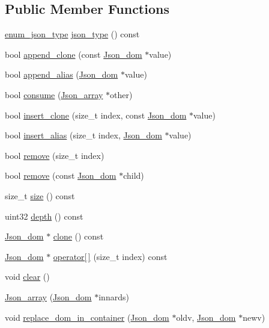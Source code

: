 \subsection*{Public Member Functions}
\begin{DoxyCompactItemize}
\item 
\mbox{\hyperlink{classJson__dom_af37eed7dfe1da1d6507d3ab85320eb03}{enum\+\_\+json\+\_\+type}} \mbox{\hyperlink{classJson__array_adbf357741dff1a92b01bfd31f97c1424}{json\+\_\+type}} () const
\item 
bool \mbox{\hyperlink{classJson__array_ae1240558ff2fa4cb2bae81d8dd332725}{append\+\_\+clone}} (const \mbox{\hyperlink{classJson__dom}{Json\+\_\+dom}} $\ast$value)
\item 
bool \mbox{\hyperlink{classJson__array_abd10bd299c6268b5195e79ed5536be1f}{append\+\_\+alias}} (\mbox{\hyperlink{classJson__dom}{Json\+\_\+dom}} $\ast$value)
\item 
bool \mbox{\hyperlink{classJson__array_a49c8a014041739ebb69367a5710ff802}{consume}} (\mbox{\hyperlink{classJson__array}{Json\+\_\+array}} $\ast$other)
\item 
bool \mbox{\hyperlink{classJson__array_acb33be78e43dd7b8c608dcbcb3a50e0e}{insert\+\_\+clone}} (size\+\_\+t index, const \mbox{\hyperlink{classJson__dom}{Json\+\_\+dom}} $\ast$value)
\item 
bool \mbox{\hyperlink{classJson__array_a9638175903fd33aa8bde389d028a7eb7}{insert\+\_\+alias}} (size\+\_\+t index, \mbox{\hyperlink{classJson__dom}{Json\+\_\+dom}} $\ast$value)
\item 
bool \mbox{\hyperlink{classJson__array_a377430a4a9ef9f7c22340d80b3bc74f7}{remove}} (size\+\_\+t index)
\item 
bool \mbox{\hyperlink{classJson__array_a0912b69f4733852316976f2dba87ad9a}{remove}} (const \mbox{\hyperlink{classJson__dom}{Json\+\_\+dom}} $\ast$child)
\item 
size\+\_\+t \mbox{\hyperlink{classJson__array_aa6ddabea5c2cd9e38920f32abf2e6e26}{size}} () const
\item 
uint32 \mbox{\hyperlink{classJson__array_a2ab9cb0a7b55a817c9babb6a74b3922e}{depth}} () const
\item 
\mbox{\hyperlink{classJson__dom}{Json\+\_\+dom}} $\ast$ \mbox{\hyperlink{classJson__array_a936f17ef11712af8bfd2d6d1aa5c9ba1}{clone}} () const
\item 
\mbox{\hyperlink{classJson__dom}{Json\+\_\+dom}} $\ast$ \mbox{\hyperlink{classJson__array_ad8a78c1f2194b6b57c3bc8e529838aea}{operator\mbox{[}$\,$\mbox{]}}} (size\+\_\+t index) const
\item 
void \mbox{\hyperlink{classJson__array_a870a69226047a6d65e114b3d32efc454}{clear}} ()
\item 
\mbox{\hyperlink{classJson__array_ac99abb112ea6f5b01b841c47b42908a3}{Json\+\_\+array}} (\mbox{\hyperlink{classJson__dom}{Json\+\_\+dom}} $\ast$innards)
\item 
void \mbox{\hyperlink{classJson__array_af6caa961d3774eebfaaef82daeab63c9}{replace\+\_\+dom\+\_\+in\+\_\+container}} (\mbox{\hyperlink{classJson__dom}{Json\+\_\+dom}} $\ast$oldv, \mbox{\hyperlink{classJson__dom}{Json\+\_\+dom}} $\ast$newv)
\end{DoxyCompactItemize}
